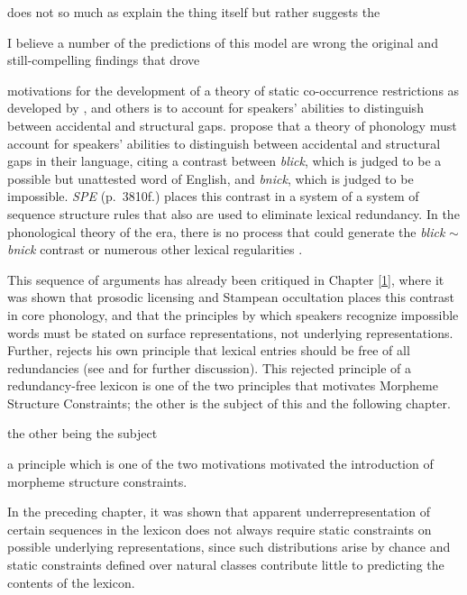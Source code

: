 \citet{Daland2011}


does not so much as explain the thing itself but rather suggests the

I believe a number of the predictions of this model are wrong
the original and still-compelling 
findings that drove 

 motivations for the development of a theory of static co-occurrence restrictions as developed by \citet{SPR}, \citet{Stanley1967} and others is to account for speakers' abilities to distinguish between accidental and structural gaps. \citet{Chomsky1965} propose that a theory of phonology must account for speakers' abilities to distinguish between accidental and structural gaps in their language, citing a contrast between \emph{blick}, which is judged to be a possible but unattested word of English, and \emph{bnick}, which is judged to be impossible. \emph{SPE} (p.~3810f.) places this contrast in a system of a system of sequence structure rules that also are used to eliminate lexical redundancy. In the phonological theory of the era, there is no process that could generate the \emph{blick} $\sim$ \emph{bnick} contrast or numerous other lexical regularities \citep[][283f.]{Anderson1974}.

This sequence of arguments has already been critiqued in Chapter \ref{1}, where it was shown that prosodic licensing and Stampean occultation places this contrast in core phonology, and that the principles by which speakers recognize impossible words must be stated on surface representations, not underlying representations. Further, \citet[][528f.]{Halle1975} rejects his own principle that lexical entries should be free of all redundancies (see \citealt[][201]{Reiss2003a} and \citealt{Vaux2003} for further discussion). This rejected principle of a redundancy-free lexicon is one of the two principles that motivates Morpheme Structure Constraints; the other is the subject of this and the following chapter.

the other being the subject 


a principle which is one of the two motivations  motivated the introduction of morpheme structure constraints.

In the preceding chapter, it was shown that apparent underrepresentation of certain sequences in the lexicon does not always require static constraints on possible underlying representations, since such distributions arise by chance and static constraints defined over natural classes contribute little to predicting the contents of the lexicon. 

